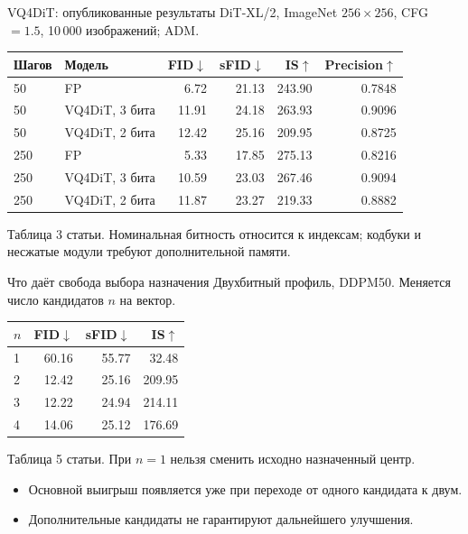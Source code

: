 \documentclass[aspectratio=169,10pt]{beamer}
\newcommand{\takeaway}[1]{\par\vspace{1.5mm}{\bfseries #1\par}}
\newcommand{\smalltext}[1]{{\fontsize{10}{12}\selectfont #1\par}}
\newcommand{\tights}{\setlength{\itemsep}{1.4mm}\setlength{\parsep}{0pt}\setlength{\parskip}{0pt}}
\newenvironment{datatable}{\par\begingroup\fontsize{10}{12}\selectfont\setlength{\tabcolsep}{4pt}\renewcommand{\arraystretch}{1.25}}{\par\endgroup}
\begin{document}
\begin{frame}[t]{VQ4DiT: опубликованные результаты}
  DiT-XL/2, ImageNet $256\times256$, CFG\,$=1.5$, 10\,000 изображений; ADM.
  \begin{datatable}
    \begin{tabular*}{\textwidth}{@{\extracolsep{\fill}}llrrrr@{}}
      \toprule
      Шагов & Модель & FID$\downarrow$ & sFID$\downarrow$ & IS$\uparrow$ & Precision$\uparrow$ \\
      \midrule
      50 & FP & 6.72 & 21.13 & 243.90 & 0.7848 \\
      50 & VQ4DiT, 3 бита & 11.91 & 24.18 & 263.93 & 0.9096 \\
      50 & VQ4DiT, 2 бита & 12.42 & 25.16 & 209.95 & 0.8725 \\
      \midrule
      250 & FP & 5.33 & 17.85 & 275.13 & 0.8216 \\
      250 & VQ4DiT, 3 бита & 10.59 & 23.03 & 267.46 & 0.9094 \\
      250 & VQ4DiT, 2 бита & 11.87 & 23.27 & 219.33 & 0.8882 \\
      \bottomrule
    \end{tabular*}
  \end{datatable}
  \smalltext{Таблица 3 статьи. Номинальная битность относится к индексам;
  кодбуки и несжатые модули требуют дополнительной памяти.}
  \takeaway{Генерация сохраняется даже при 2 битах на индексы,\par
  но FID заметно хуже исходной модели. Высокий IS не отменяет этого разрыва.}
\end{frame}

\begin{frame}[t]{Что даёт свобода выбора назначения}
  Двухбитный профиль, DDPM50. Меняется число кандидатов $n$ на вектор.
  \begin{datatable}
    \begin{tabular*}{\textwidth}{@{\extracolsep{\fill}}lrrr@{}}
      \toprule
      $n$ & FID$\downarrow$ & sFID$\downarrow$ & IS$\uparrow$ \\
      \midrule
      1 & 60.16 & 55.77 & 32.48 \\
      2 & 12.42 & 25.16 & 209.95 \\
      3 & 12.22 & 24.94 & 214.11 \\
      4 & 14.06 & 25.12 & 176.69 \\
      \bottomrule
    \end{tabular*}
  \end{datatable}
  \smalltext{Таблица 5 статьи. При $n=1$ нельзя сменить исходно назначенный центр.}
  \begin{itemize}\tights
    \item Основной выигрыш появляется уже при переходе от одного кандидата к двум.
    \item Дополнительные кандидаты не гарантируют дальнейшего улучшения.
  \end{itemize}
  \takeaway{Назначения важны, но поиск ограничен\par
  исходным набором кандидатов.}
\end{frame}
\end{document}
